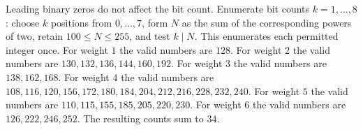 Leading binary zeros do not affect the bit count. Enumerate bit counts $k=1,\ldots,8$: choose $k$ positions from $0,\ldots,7$, form $N$ as the sum of the corresponding powers of two, retain $100\le N\le255$, and test $k\mid N$. This enumerates each permitted integer once. For weight $1$ the valid numbers are $128$. For weight $2$ the valid numbers are $130,132,136,144,160,192$. For weight $3$ the valid numbers are $138,162,168$. For weight $4$ the valid numbers are $108,116,120,156,172,180,184,204,212,216,228,232,240$. For weight $5$ the valid numbers are $110,115,155,185,205,220,230$. For weight $6$ the valid numbers are $126,222,246,252$. The resulting counts sum to $\boxed{34}$.
